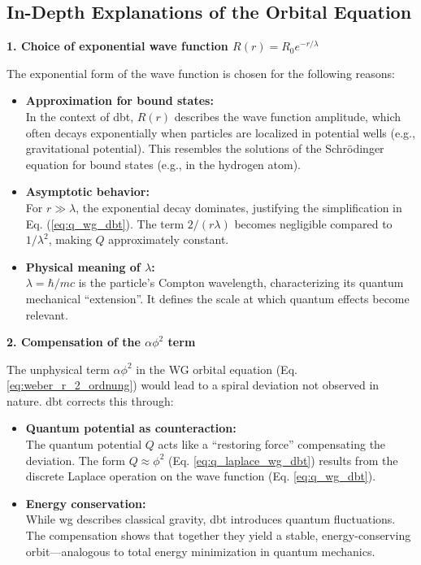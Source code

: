 \subsection{In-Depth Explanations of the Orbital Equation}
\textbf{1. Choice of exponential wave function $R(r)=R_0 e^{-r/\lambda}$}

The exponential form of the wave function is chosen for the following reasons:
\begin{itemize}
    \item \textbf{Approximation for bound states:}\\In the context of \gls{dbt}, $R(r)$ describes the wave function amplitude, which often decays exponentially when particles are localized in potential wells (e.g., gravitational potential). This resembles the solutions of the Schrödinger equation for bound states (e.g., in the hydrogen atom).
    \item \textbf{Asymptotic behavior:}\\For $r \gg \lambda$, the exponential decay dominates, justifying the simplification in Eq. (\ref{eq:q_wg_dbt}). The term $2/(r \lambda)$ becomes negligible compared to $1/\lambda^{2}$, making $Q$ approximately constant.
    \item \textbf{Physical meaning of $\lambda$:}\\$\lambda=\hbar/mc$ is the particle's Compton wavelength, characterizing its quantum mechanical \enquote{extension}. It defines the scale at which quantum effects become relevant.
\end{itemize}

\textbf{2. Compensation of the $\alpha \phi^{2}$ term}

The unphysical term $\alpha \phi^{2}$ in the WG orbital equation (Eq. \ref{eq:weber_r_2_ordnung}) would lead to a spiral deviation not observed in nature.
\gls{dbt} corrects this through:
\begin{itemize}
    \item \textbf{Quantum potential as counteraction:}\\The quantum potential $Q$ acts like a \enquote{restoring force} compensating the deviation. The form $Q \approx \phi^{2}$ (Eq. \ref{eq:q_laplace_wg_dbt}) results from the discrete Laplace operation on the wave function (Eq. \ref{eq:q_wg_dbt}).
    \item \textbf{Energy conservation:}\\While \gls{wg} describes classical gravity, \gls{dbt} introduces quantum fluctuations. The compensation shows that together they yield a stable, energy-conserving orbit—analogous to total energy minimization in quantum mechanics.
\end{itemize}

